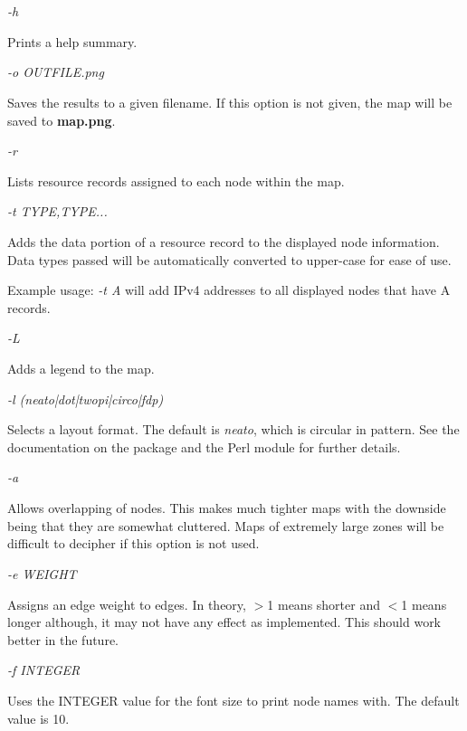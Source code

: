 \begin{description}

\item {\it -h}\verb" "

Prints a help summary.

\item {\it -o OUTFILE.png}\verb" "

Saves the results to a given filename.  If this option is not given, the map
will be saved to {\bf map.png}.

\item {\it -r}\verb" "

Lists resource records assigned to each node within the map.

\item {\it -t TYPE,TYPE...}\verb" "

Adds the data portion of a resource record to the displayed node
information.  Data types passed will be automatically converted to
upper-case for ease of use.

Example usage: {\it -t A} will add IPv4 addresses to
all displayed nodes that have A records.

\item {\it -L}\verb" "

Adds a legend to the map.

\item {\it -l (neato|dot|twopi|circo|fdp)}\verb" "

Selects a layout format.  The default is {\it neato}, which is circular in
pattern.  See the documentation on the  package and the
 Perl module for further details.

\item {\it -a}\verb" "

Allows overlapping of nodes.  This makes much tighter maps with the
downside being that they are somewhat cluttered.  Maps of extremely
large zones will be difficult to decipher if this option is not used.

\item {\it -e WEIGHT}\verb" "

Assigns an edge weight to edges.  In theory, $>$1 means shorter and $<$1 means
longer although, it may not have any effect as implemented.
This should work better in the future.

\item {\it -f INTEGER}\verb" "

Uses the INTEGER value for the font size to print node names with.
The default value is 10.


\end{description}
